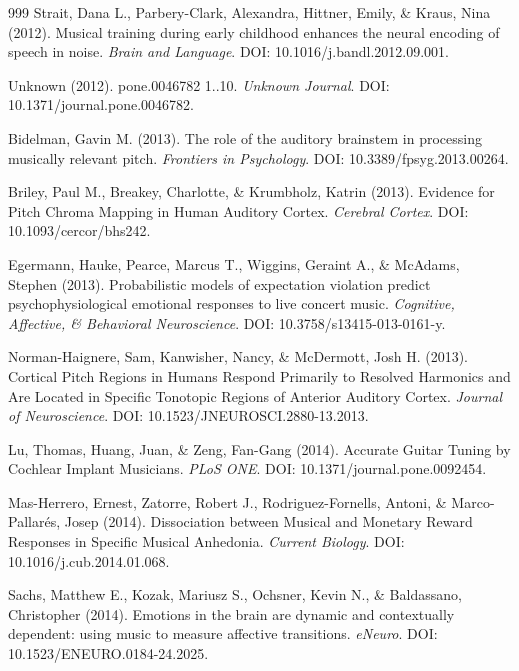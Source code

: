 \documentclass[9pt,onecolumn]{article}
\begin{document}
\begin{thebibliography}{999}
Strait, Dana L., Parbery-Clark, Alexandra, Hittner, Emily, \& Kraus, Nina (2012). Musical training during early childhood enhances the neural encoding of speech in noise. \textit{Brain and Language}. DOI: 10.1016/j.bandl.2012.09.001.

Unknown (2012). pone.0046782 1..10. \textit{Unknown Journal}. DOI: 10.1371/journal.pone.0046782.

Bidelman, Gavin M. (2013). The role of the auditory brainstem in processing musically relevant pitch. \textit{Frontiers in Psychology}. DOI: 10.3389/fpsyg.2013.00264.

Briley, Paul M., Breakey, Charlotte, \& Krumbholz, Katrin (2013). Evidence for Pitch Chroma Mapping in Human Auditory Cortex. \textit{Cerebral Cortex}. DOI: 10.1093/cercor/bhs242.

Egermann, Hauke, Pearce, Marcus T., Wiggins, Geraint A., \& McAdams, Stephen (2013). Probabilistic models of expectation violation predict psychophysiological emotional responses to live concert music. \textit{Cognitive, Affective, \& Behavioral Neuroscience}. DOI: 10.3758/s13415-013-0161-y.

Norman-Haignere, Sam, Kanwisher, Nancy, \& McDermott, Josh H. (2013). Cortical Pitch Regions in Humans Respond Primarily to Resolved Harmonics and Are Located in Specific Tonotopic Regions of Anterior Auditory Cortex. \textit{Journal of Neuroscience}. DOI: 10.1523/JNEUROSCI.2880-13.2013.

Lu, Thomas, Huang, Juan, \& Zeng, Fan-Gang (2014). Accurate Guitar Tuning by Cochlear Implant Musicians. \textit{PLoS ONE}. DOI: 10.1371/journal.pone.0092454.

Mas-Herrero, Ernest, Zatorre, Robert J., Rodriguez-Fornells, Antoni, \& Marco-Pallarés, Josep (2014). Dissociation between Musical and Monetary Reward Responses in Specific Musical Anhedonia. \textit{Current Biology}. DOI: 10.1016/j.cub.2014.01.068.

Sachs, Matthew E., Kozak, Mariusz S., Ochsner, Kevin N., \& Baldassano, Christopher (2014). Emotions in the brain are dynamic and contextually dependent: using music to measure affective transitions. \textit{eNeuro}. DOI: 10.1523/ENEURO.0184-24.2025.


\end{thebibliography}
\end{document}
